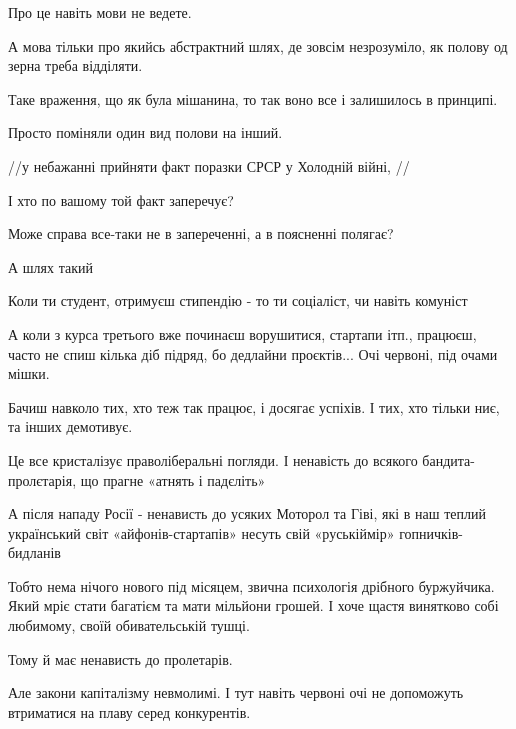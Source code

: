 \begin{itemize}
\begin{itemize}
Про це навіть мови не ведете.

А мова тільки про якийсь абстрактний шлях, де зовсім незрозуміло, як полову од
зерна треба відділяти.

Таке враження, що як була мішанина, то так воно все і залишилось в принципі.

Просто поміняли один вид полови на інший.

//у небажанні прийняти факт поразки СРСР у Холодній війні, //

І хто по вашому той факт заперечує?

Може справа все-таки не в запереченні, а в поясненні полягає?

 

А шлях такий

Коли ти студент, отримуєш стипендію - то ти соціаліст, чи навіть комуніст

А коли з курса третього вже починаєш ворушитися, стартапи ітп., працюєш, часто
не спиш кілька діб підряд, бо дедлайни проєктів... Очі червоні, під очами мішки.

Бачиш навколо тих, хто теж так працює, і досягає успіхів. І тих, хто тільки
ниє, та інших демотивує.

Це все кристалізує праволіберальні погляди. І ненавість до всякого
бандита-пролєтарія, що прагне «атнять і падєліть»

А після нападу Росії - ненависть до усяких Моторол та Гіві, які в наш теплий
український світ «айфонів-стартапів» несуть свій «руськіймір»
гопничків-бидланів

 

Тобто нема нічого нового під місяцем, звична психологія дрібного буржуйчика.
Який мріє стати багатієм та мати мільйони грошей. І хоче щастя винятково собі
любимому, своїй обивательській тушці.

Тому й має ненависть до пролетарів.

Але закони капіталізму невмолимі. І тут навіть червоні очі не допоможуть
втриматися на плаву серед конкурентів.


\end{itemize}
\end{itemize}
